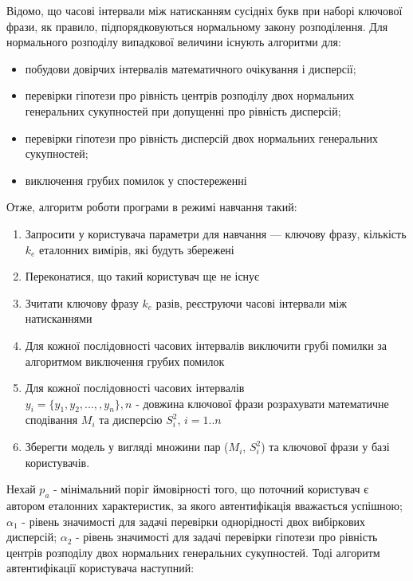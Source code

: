 \documentclass{dstu}
\begin{document}
Відомо, що часові інтервали між натисканням сусідніх букв при наборі ключової фрази,
як правило, підпорядковуються нормальному закону розподілення. Для нормального
розподілу випадкової величини існують алгоритми для:

\begin{itemize}
	\item побудови довірчих інтервалів математичного очікування і дисперсії;

	\item перевірки гіпотези про рівність центрів розподілу двох нормальних 
	генеральних сукупностей при допущенні про рівність дисперсій;

	\item перевірки гіпотези про рівність дисперсій двох нормальних 
	генеральних сукупностей;
	
	\item виключення грубих помилок у спостереженні
\end{itemize}

\bigskip
Отже, алгоритм роботи програми в режимі навчання такий:

\begin{enumerate}
	\item Запросити у користувача параметри для навчання — ключову фразу, кількість $k_e$ еталонних вимірів, які будуть збережені
	\item Переконатися, що такий користувач ще не існує
	\item Зчитати ключову фразу $k_e$ разів, реєструючи часові інтервали між натисканнями
	\item Для кожної послідовності часових інтервалів виключити грубі помилки за алгоритмом виключення грубих помилок
	\item Для кожної послідовності часових інтервалів $y_i = \{y_1, y_2, ...,, y_n\}, \text{$n$ - довжина ключової фрази}$ розрахувати 
	математичне сподівання $M_i$ та дисперсію $S^2_i$, $i = 1..n$
	\item Зберегти модель у вигляді множини пар
	($M_i$, $S^2_i$) та ключової фрази у базі користувачів.
\end{enumerate}

Нехай $p_a$ - мінімальний поріг ймовірності того, що поточний користувач є автором еталонних характеристик, за якого 
автентифікація вважається успішною; $\alpha_1$ - рівень значимості для задачі перевірки однорідності двох вибіркових дисперсій;
$\alpha_2$ - рівень значимості для задачі перевірки гіпотези про рівність центрів розподілу двох 
нормальних генеральних сукупностей. Тоді алгоритм автентифікації користувача наступний:
\end{document}
